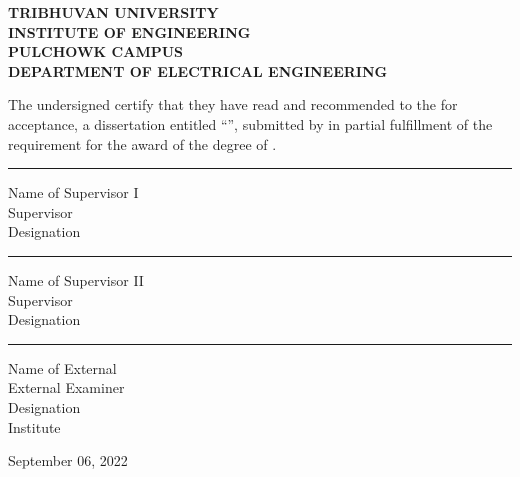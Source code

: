 

\newpage
\begin{center}
 {\bfseries TRIBHUVAN UNIVERSITY \\ \vspace{0.050cm}
    INSTITUTE OF ENGINEERING \\ \vspace{0.05cm}
    PULCHOWK CAMPUS  \\ \vspace{0.05cm}
    DEPARTMENT OF ELECTRICAL ENGINEERING
    }
\end{center}
\vspace{0.4cm}
The undersigned certify that they have read and recommended to the \deptname \hspace{1pt} for acceptance, a dissertation entitled ``\textbf{\ttitle}'', submitted by \textbf{\authorname} in partial fulfillment of the requirement for the award of the degree of \textbf{\degreename}. 
\vspace{1cm}


\hfill\begin{minipage} [!H]{0.55\textwidth}
\vspace{1cm}

\rule[0.5em]{15em}{0.6pt}\break
Name of Supervisor I\\
Supervisor\\
Designation\\



\vspace{1.5cm}
\rule[0.5em]{15em}{0.6pt}\break
Name of Supervisor II\\
Supervisor\\
Designation\\



\vspace{1.5cm}
\rule[0.5em]{15em}{0.6pt}\break
Name of External\\
External Examiner\\
Designation\\
Institute
\end{minipage}

\vspace*{\fill}
September 06, 2022



